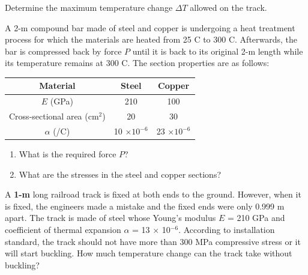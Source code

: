 \documentclass[
10pt,
a4paper,
openany,
svgnames,
]{kaobook} %
\begin{document}
\begin{exercises}
  \begin{figure}[H]
    \centering
  \end{figure}
  
  Determine the maximum temperature change $\Delta T$ allowed on the track.
	
\item A 2-m compound bar made of steel and copper is undergoing a heat treatment process for which the materials are heated from 25 C to 300 C. Afterwards, the bar is compressed back by force $P$ until it is back to its original 2-m length while its temperature remains at 300 C. The section properties are as follows:
  
  \begin{table}
    \centering
    \begin{tabular}{ c c c }
      \toprule
      Material	&		Steel	&		Copper \\
      \midrule
      $E$ (GPa)	&	210	&	100	\\
      Cross-sectional area (cm$^2$)	&	20	& 30 \\
      $\alpha$ (/C)	&	10 $\times 10^{-6}$	& 23 $\times 10^{-6}$ \\
      \bottomrule
    \end{tabular}
  \end{table}
  
  \begin{enumerate}
  \item What is the required force $P$?
  \item What are the stresses in the steel and copper sections?
  \end{enumerate}
  
\item A \textbf{1-m} long railroad track is fixed at both ends to the ground. However, when it is fixed, the engineers made a mistake and the fixed ends were only 0.999 m apart. The track is made of steel whose Young's modulus $E$ = 210 GPa and coefficient of thermal expansion $\alpha$ = 13 $\times$ 10$^{-6}$. According to installation standard, the track should  not have more than 300 MPa compressive stress or it will start buckling. How much temperature change can the track take without buckling?


\end{exercises}
\end{document}
